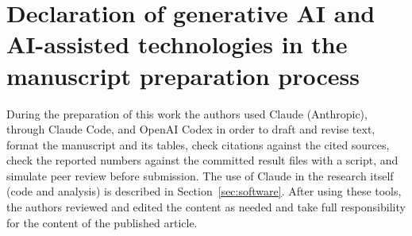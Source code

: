 \section*{Declaration of generative AI and AI-assisted technologies in the manuscript preparation process}
During the preparation of this work the authors used Claude (Anthropic), through Claude Code, and OpenAI Codex in order
to draft and revise text, format the manuscript and its tables, check citations against the cited sources, check the
reported numbers against the committed result files with a script, and simulate peer review before submission. The use
of Claude in the research itself (code and analysis) is described in Section~\ref{sec:software}. After using these
tools, the authors reviewed and edited the content as needed and take full responsibility for the content of the
published article.
